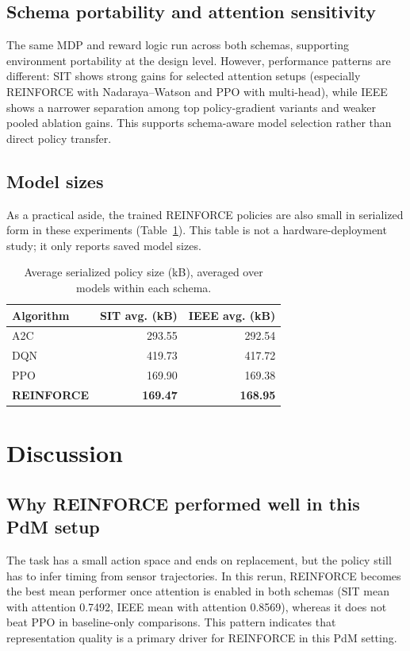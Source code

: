\documentclass[sn-basic]{sn-jnl}%
\begin{document}
\subsection{Schema portability and attention sensitivity}
The same MDP and reward logic run across both schemas, supporting environment portability at the design level. However, performance patterns are different: SIT shows strong gains for selected attention setups (especially \textsc{REINFORCE} with Nadaraya--Watson and \textsc{PPO} with multi-head), while IEEE shows a narrower separation among top policy-gradient variants and weaker pooled ablation gains. This supports schema-aware model selection rather than direct policy transfer.

\subsection{Model sizes}
As a practical aside, the trained \textsc{REINFORCE} policies are also small in serialized form in these experiments (Table~\ref{tab:model_size_summary}). This table is not a hardware-deployment study; it only reports saved model sizes.

\begin{table}[htbp]
\centering
\caption{Average serialized policy size (kB), averaged over models within each schema.}
\label{tab:model_size_summary}
\begin{tabular}{l r r}
\toprule
	\textbf{Algorithm} & \textbf{SIT avg. (kB)} & \textbf{IEEE avg. (kB)}\\
	\midrule
	A2C & 293.55 & 292.54\\
	DQN & 419.73 & 417.72\\
	PPO & 169.90 & 169.38\\
	\textbf{REINFORCE} & \textbf{169.47} & \textbf{168.95}\\
\bottomrule
\end{tabular}
\end{table}

\section{Discussion}
\label{sec:discussion}
\subsection{Why REINFORCE performed well in this PdM setup}
The task has a small action space and ends on replacement, but the policy still has to infer timing from sensor trajectories. In this rerun, \textsc{REINFORCE} becomes the best mean performer once attention is enabled in both schemas (SIT mean with attention 0.7492, IEEE mean with attention 0.8569), whereas it does not beat \textsc{PPO} in baseline-only comparisons. This pattern indicates that representation quality is a primary driver for \textsc{REINFORCE} in this PdM setting.
\end{document}
